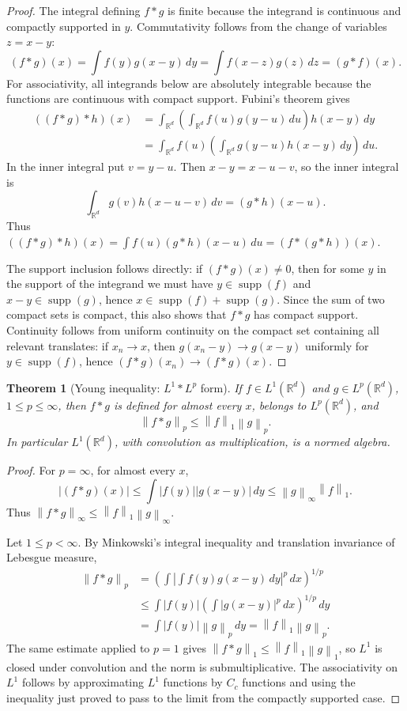 \documentclass[11pt,openany]{book}
\numberwithin{equation}{chapter}
\theoremstyle{definition}
\theoremstyle{plain}
\newtheorem{theorem}[definition]{Theorem}
\theoremstyle{remark}
\newcommand{\R}{\mathbb{R}}
\newcommand{\1}{\mathbf{1}}
\newcommand{\dd}{\,d}
\newcommand{\abs}[1]{\left\lvert #1\right\rvert}
\newcommand{\norm}[1]{\left\lVert #1\right\rVert}
\newcommand{\supp}{\operatorname{supp}}
\begin{document}
\begin{proof}
The integral defining \(f*g\) is finite because the integrand is continuous and compactly supported in \(y\).  Commutativity follows from the change of variables \(z=x-y\):
\[
    (f*g)(x)=\int f(y)g(x-y)\dd y
    =\int f(x-z)g(z)\dd z=(g*f)(x).
\]
For associativity, all integrands below are absolutely integrable because the functions are continuous with compact support.  Fubini's theorem gives
\[
\begin{aligned}
((f*g)*h)(x)
&=\int_{\R^d}\left(\int_{\R^d}f(u)g(y-u)\dd u\right)h(x-y)\dd y\\
&=\int_{\R^d}f(u)\left(\int_{\R^d}g(y-u)h(x-y)\dd y\right)\dd u.
\end{aligned}
\]
In the inner integral put \(v=y-u\).  Then \(x-y=x-u-v\), so the inner integral is
\[
    \int_{\R^d}g(v)h(x-u-v)\dd v=(g*h)(x-u).
\]
Thus \(((f*g)*h)(x)=\int f(u)(g*h)(x-u)\dd u=(f*(g*h))(x)\).

The support inclusion follows directly: if \((f*g)(x)\ne0\), then for some \(y\) in the support of the integrand we must have \(y\in\supp(f)\) and \(x-y\in\supp(g)\), hence \(x\in\supp(f)+\supp(g)\).  Since the sum of two compact sets is compact, this also shows that \(f*g\) has compact support.  Continuity follows from uniform continuity on the compact set containing all relevant translates: if \(x_n\to x\), then \(g(x_n-y)\to g(x-y)\) uniformly for \(y\in\supp(f)\), hence \((f*g)(x_n)\to(f*g)(x)\).
\end{proof}

\begin{theorem}[Young inequality: \texorpdfstring{$L^1*L^p$}{L1-Lp} form]
If \(f\in L^1(\R^d)\) and \(g\in L^p(\R^d)\), \(1\le p\le\infty\), then \(f*g\) is defined for almost every \(x\), belongs to \(L^p(\R^d)\), and
\[
    \norm{f*g}_p\le \norm{f}_1\norm{g}_p.
\]
In particular \(L^1(\R^d)\), with convolution as multiplication, is a normed algebra.
\end{theorem}

\begin{proof}
For \(p=\infty\), for almost every \(x\),
\[
    \abs{(f*g)(x)}
    \le\int\abs{f(y)}\abs{g(x-y)}\dd y
    \le \norm{g}_\infty\norm{f}_1.
\]
Thus \(\norm{f*g}_\infty\le \norm f_1\norm g_\infty\).

Let \(1\le p<\infty\).  By Minkowski's integral inequality and translation invariance of Lebesgue measure,
\[
\begin{aligned}
\norm{f*g}_p
&=\left(\int\left|\int f(y)g(x-y)\dd y\right|^p\dd x\right)^{1/p}\\
&\le\int\abs{f(y)}\left(\int\abs{g(x-y)}^p\dd x\right)^{1/p}\dd y\\
&=\int\abs{f(y)}\norm{g}_p\dd y
=\norm{f}_1\norm{g}_p.
\end{aligned}
\]
The same estimate applied to \(p=1\) gives \(\norm{f*g}_1\le\norm f_1\norm g_1\), so \(L^1\) is closed under convolution and the norm is submultiplicative.  The associativity on \(L^1\) follows by approximating \(L^1\) functions by \(C_c\) functions and using the inequality just proved to pass to the limit from the compactly supported case.
\end{proof}
\end{document}

